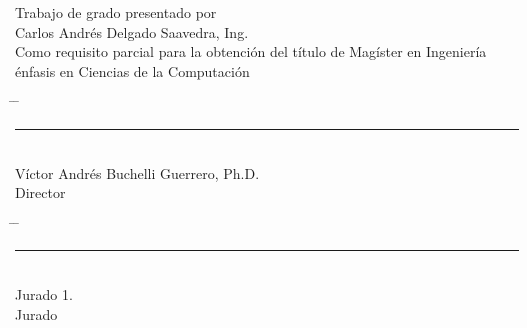 \vspace*{4cm}
\begin{center}
Trabajo de grado presentado por\\
Carlos Andrés Delgado Saavedra, Ing.\\
Como requisito parcial para la obtención del título de Magíster en Ingeniería énfasis en Ciencias de la Computación
\end{center}
\vfill
\begin{center}
\begin{tabbing}
\hspace{0.05\textwidth} \= \hspace{0.05\textwidth} \= \kill
\rule{70mm}{0.1mm} \>%
\\
Víctor Andrés Buchelli Guerrero, Ph.D.\> %
\\
Director \>%
\end{tabbing}
\end{center}
\vfill
\begin{center}
\begin{tabbing}
\hspace{0.05\textwidth} \= \hspace{0.05\textwidth} \= \kill
\rule{70mm}{0.1mm} \> \rightline{\rule{70mm}{0.1mm}} \\
Jurado 1. \> \\
Jurado \> 
\end{tabbing}
\end{center}
\vfill

